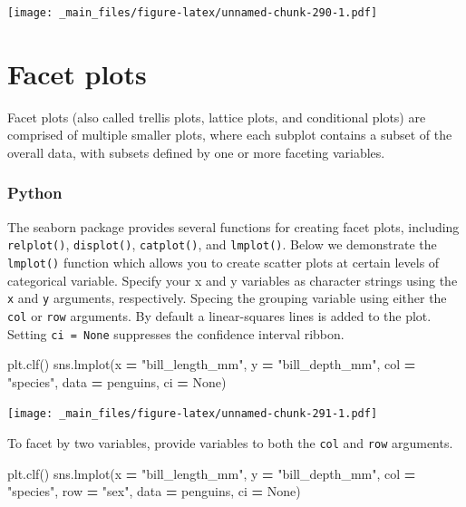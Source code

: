 \documentclass[
]{book}
\newenvironment{Shaded}{\begin{snugshade}}{\end{snugshade}}
\newcommand{\NormalTok}[1]{#1}
\newcommand{\OperatorTok}[1]{\textcolor[rgb]{0.81,0.36,0.00}{\textbf{#1}}}
\newcommand{\StringTok}[1]{\textcolor[rgb]{0.31,0.60,0.02}{#1}}
\newcommand{\VariableTok}[1]{\textcolor[rgb]{0.00,0.00,0.00}{#1}}
\begin{document}
\texttt{[image: \_main\_files/figure-latex/unnamed-chunk-290-1.pdf]}

\hypertarget{facet-plots}{%
\section{Facet plots}\label{facet-plots}}

Facet plots (also called trellis plots, lattice plots, and conditional plots) are comprised of multiple smaller plots, where each subplot contains a subset of the overall data, with subsets defined by one or more faceting variables.

\hypertarget{python-46}{%
\subsubsection*{Python}\label{python-46}}

The seaborn package provides several functions for creating facet plots, including \texttt{relplot()}, \texttt{displot()}, \texttt{catplot()}, and \texttt{lmplot()}. Below we demonstrate the \texttt{lmplot()} function which allows you to create scatter plots at certain levels of categorical variable. Specify your x and y variables as character strings using the \texttt{x} and \texttt{y} arguments, respectively. Specing the grouping variable using either the \texttt{col} or \texttt{row} arguments. By default a linear-squares lines is added to the plot. Setting \texttt{ci\ =\ None} suppresses the confidence interval ribbon.

\begin{Shaded}
\begin{Highlighting}[]
\NormalTok{plt.clf()}
\NormalTok{sns.lmplot(x }\OperatorTok{=} \StringTok{"bill\_length\_mm"}\NormalTok{, y }\OperatorTok{=} \StringTok{"bill\_depth\_mm"}\NormalTok{, col }\OperatorTok{=} \StringTok{"species"}\NormalTok{,}
\NormalTok{          data }\OperatorTok{=}\NormalTok{ penguins, ci }\OperatorTok{=} \VariableTok{None}\NormalTok{)}
\end{Highlighting}
\end{Shaded}

\texttt{[image: \_main\_files/figure-latex/unnamed-chunk-291-1.pdf]}

To facet by two variables, provide variables to both the \texttt{col} and \texttt{row} arguments.

\begin{Shaded}
\begin{Highlighting}[]
\NormalTok{plt.clf()}
\NormalTok{sns.lmplot(x }\OperatorTok{=} \StringTok{"bill\_length\_mm"}\NormalTok{, y }\OperatorTok{=} \StringTok{"bill\_depth\_mm"}\NormalTok{, }
\NormalTok{           col }\OperatorTok{=} \StringTok{"species"}\NormalTok{, row }\OperatorTok{=} \StringTok{"sex"}\NormalTok{,}
\NormalTok{           data }\OperatorTok{=}\NormalTok{ penguins, ci }\OperatorTok{=} \VariableTok{None}\NormalTok{)}
\end{Highlighting}
\end{Shaded}
\end{document}
